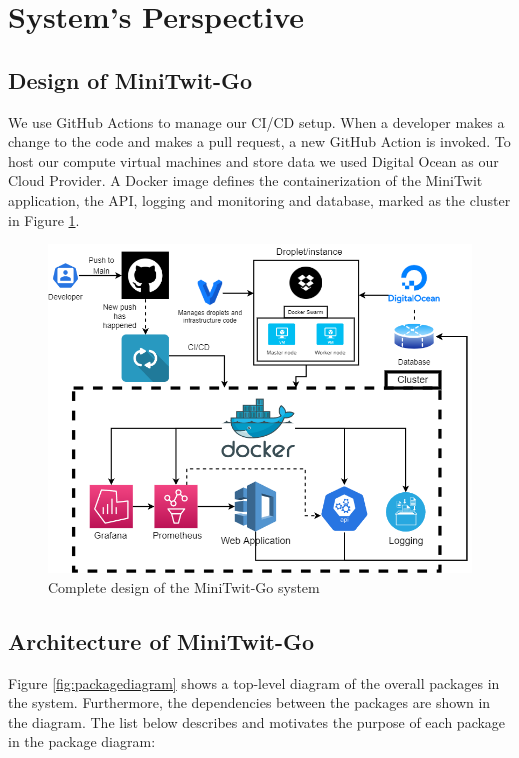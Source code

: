 \section{System's Perspective}
\label{system-perspective}

\subsection{Design of MiniTwit-Go}
We use GitHub Actions to manage our CI/CD setup. When a developer makes a change to the code and makes a pull request, a new GitHub Action is invoked. To host our compute virtual machines and store data we used Digital Ocean as our Cloud Provider. A Docker image defines the containerization of the MiniTwit application, the API, logging and monitoring and database, marked as the cluster in Figure \ref{fig:design}.


\begin{figure}[ht]
		\centering
		\includegraphics[width=\textwidth]{images/devops_3_design.png}
		\caption{Complete design of the MiniTwit-Go system}
		\label{fig:design}
\end{figure}
	
\subsection{Architecture of MiniTwit-Go}
Figure \ref{fig:packagediagram} shows a top-level diagram of the overall packages in the system. Furthermore, the dependencies between the packages are shown in the diagram. The list below describes and motivates the purpose of each package in the package diagram:

